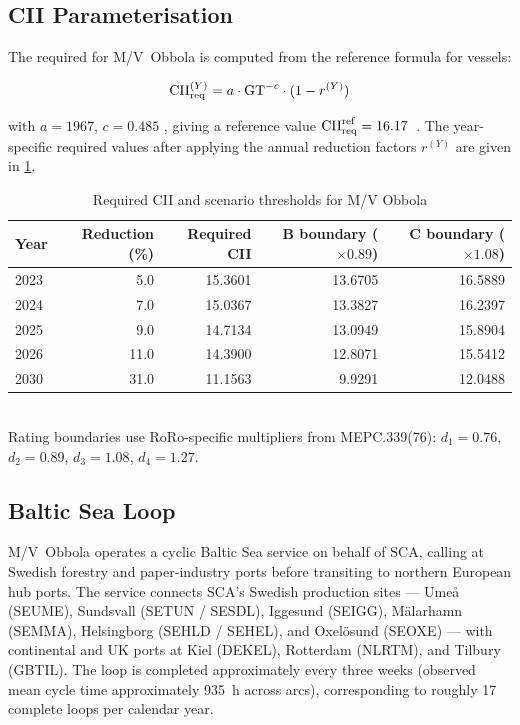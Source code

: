 \subsection{CII Parameterisation}
\label{sec:case:cii}

The required \CII{} for M/V~Obbola is computed from the \IMO{}
reference formula for \RoRo{} vessels:

\begin{equation}
  \mathrm{CII}_{\mathrm{req}}^{(Y)} = a \cdot \mathrm{GT}^{-c} \cdot (1 - r^{(Y)})
  \label{eq:cii_required}
\end{equation}

\noindent with $a = 1967$, $c = 0.485$ \parencite{mepc336}, giving a
reference value $\mathrm{CII}_{\mathrm{req}}^{\mathrm{ref}} = 16.17$~\gGTnm{}.
The year-specific required \CII{} values after applying the annual
reduction factors $r^{(Y)}$ are given in \cref{tab:cii_required}.

\begin{table}[h]
\centering
\caption{Required CII and scenario thresholds for M/V Obbola}
\label{tab:cii_required}
\begin{tabular}{lrrrr}
  \toprule
  Year & {Reduction (\%)} & {Required CII} & {B boundary ($\times 0.89$)}
       & {C boundary ($\times 1.08$)} \\
  \midrule
  2023 & 5.0  & 15.3601 & 13.6705 & 16.5889 \\
  2024 & 7.0  & 15.0367 & 13.3827 & 16.2397 \\
  2025 & 9.0  & 14.7134 & 13.0949 & 15.8904 \\
  2026 & 11.0 & 14.3900 & 12.8071 & 15.5412 \\
  2030 & 31.0 & 11.1563 & 9.9291  & 12.0488 \\
  \bottomrule
\end{tabular}
\smallskip\\
{\footnotesize Rating boundaries use RoRo-specific multipliers from
MEPC.339(76): $d_1=0.76$, $d_2=0.89$, $d_3=1.08$, $d_4=1.27$.}
\end{table}

\subsection{Baltic Sea Loop}
\label{sec:case:route}

M/V~Obbola operates a cyclic Baltic Sea service on behalf of SCA, calling
at Swedish forestry and paper-industry ports before transiting to northern
European hub ports.  The service connects SCA's Swedish production sites ---
Umeå (SEUME), Sundsvall (SETUN / SESDL), Iggesund (SEIGG), Mälarhamn
(SEMMA), Helsingborg (SEHLD / SEHEL), and Oxelösund (SEOXE) --- with
continental and UK ports at Kiel (DEKEL), Rotterdam (NLRTM), and Tilbury
(GBTIL).  The loop is completed approximately every three weeks
(observed mean cycle time approximately 935~h across arcs), corresponding
to roughly 17 complete loops per calendar year.

